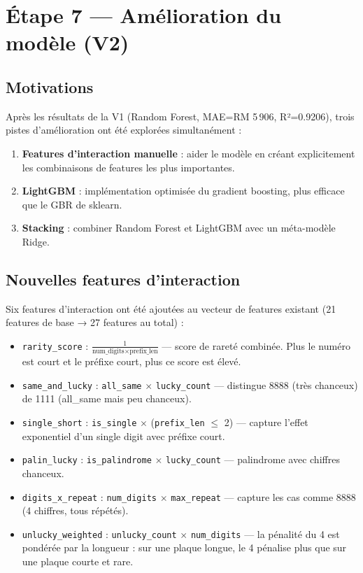 \documentclass[12pt, a4paper]{article}
\begin{document}
\section{Étape 7 — Amélioration du modèle (V2)}
\label{sec:v2}

\subsection{Motivations}

Après les résultats de la V1 (Random Forest, MAE=RM 5\,906, R²=0.9206), trois pistes d'amélioration ont été explorées simultanément :

\begin{enumerate}
  \item \textbf{Features d'interaction manuelle} : aider le modèle en créant explicitement les combinaisons de features les plus importantes.
  \item \textbf{LightGBM} : implémentation optimisée du gradient boosting, plus efficace que le GBR de sklearn.
  \item \textbf{Stacking} : combiner Random Forest et LightGBM avec un méta-modèle Ridge.
\end{enumerate}

\subsection{Nouvelles features d'interaction}

Six features d'interaction ont été ajoutées au vecteur de features existant (21 features de base → 27 features au total) :

\begin{itemize}
  \item \texttt{rarity\_score} : $\frac{1}{\text{num\_digits} \times \text{prefix\_len}}$ — score de rareté combinée. Plus le numéro est court et le préfixe court, plus ce score est élevé.
  \item \texttt{same\_and\_lucky} : \texttt{all\_same} $\times$ \texttt{lucky\_count} — distingue 8888 (très chanceux) de 1111 (all\_same mais peu chanceux).
  \item \texttt{single\_short} : \texttt{is\_single} $\times$ (\texttt{prefix\_len} $\leq$ 2) — capture l'effet exponentiel d'un single digit avec préfixe court.
  \item \texttt{palin\_lucky} : \texttt{is\_palindrome} $\times$ \texttt{lucky\_count} — palindrome avec chiffres chanceux.
  \item \texttt{digits\_x\_repeat} : \texttt{num\_digits} $\times$ \texttt{max\_repeat} — capture les cas comme 8888 (4 chiffres, tous répétés).
  \item \texttt{unlucky\_weighted} : \texttt{unlucky\_count} $\times$ \texttt{num\_digits} — la pénalité du 4 est pondérée par la longueur : sur une plaque longue, le 4 pénalise plus que sur une plaque courte et rare.
\end{itemize}
\end{document}
